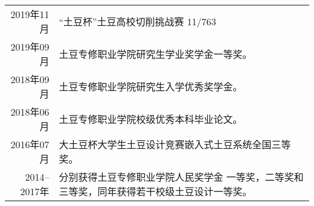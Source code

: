 


\begin{tabular}{rl}	
	2019年11月  & “土豆杯”土豆高校切削挑战赛 11/763 \\
	2019年09月  & 土豆专修职业学院研究生学业奖学金一等奖。 \\ 
	2018年09月  & 土豆专修职业学院研究生入学优秀奖学金。 \\
	2018年06月  & 土豆专修职业学院校级优秀本科毕业论文。 \\
	2016年07月  & 大土豆杯大学生土豆设计竞赛嵌入式土豆系统全国三等奖。 \\
	2014--2017年 & 分别获得土豆专修职业学院人民奖学金 一等奖，二等奖和三等奖，同年获得若干校级土豆设计一等奖。
\end{tabular}

